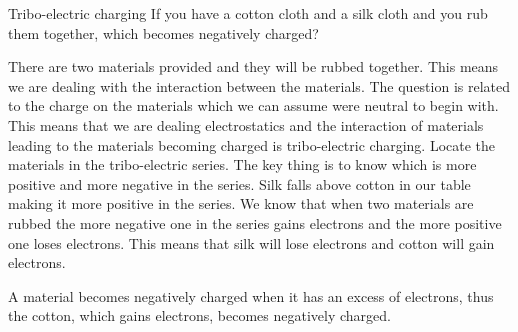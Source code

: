 \begin{wex}{Tribo-electric charging}
{If you have a cotton cloth and a silk cloth and you rub them together, which becomes negatively charged?}
{
There are two materials provided and they will be rubbed together. This means we are dealing with the interaction between the materials. The question is related to the charge on the materials which we can assume were neutral to begin with. This means that we are dealing electrostatics and the interaction of materials leading to the materials becoming charged is tribo-electric charging.
Locate the materials in the tribo-electric series. The key thing is to know which is more positive and more negative in the series. Silk falls above cotton in our table making it more positive in the series.
We know that when two materials are rubbed the more negative one in the series gains electrons and the more positive one loses electrons. This means that silk will lose electrons and cotton will gain electrons.
\par
A material becomes negatively charged when it has an excess of electrons, thus the cotton, which gains electrons, becomes negatively charged.}\end{wex}

